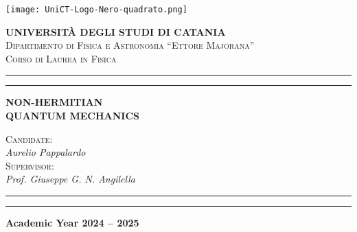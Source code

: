 \newcommand{\unictsize}{0.3\textwidth}
\newcommand{\dfasize}{0.6\textwidth}
\newcommand{\namesize}{0.8\textwidth}
\newcommand{\doublerule}{\hrule \vspace{3pt} \hrule}

\begin{titlingpage}
    \begin{center}
        \begin{minipage}[h!]{\linewidth}
            \begin{minipage}[ht!]{\linewidth}
                \centering
                \texttt{[image: UniCT-Logo-Nero-quadrato.png]}
            \end{minipage}
            \centering\large
            \textbf{UNIVERSITÀ DEGLI STUDI DI CATANIA}
            \\[5pt]
            \normalsize
            \textsc{Dipartimento di Fisica e Astronomia ``Ettore Majorana''}
            \\[5pt]
            \textsc{Corso di Laurea in Fisica}
            \\[10pt]
            \doublerule
        \end{minipage}
        \vfill
        {\Huge\bfseries NON-HERMITIAN\\[10pt]QUANTUM MECHANICS}
        \vfill
        \centering
        \large
        \begin{minipage}[h]{\namesize}
            \raggedleft
            \textsc{Candidate:}\\
            \textit{Aurelio Pappalardo}
            \\[10pt]
            \textsc{Supervisor:}\\
            \textit{Prof. Giuseppe G. N. Angilella}
        \end{minipage}
        \vspace{30pt}
        \doublerule
        \vspace{10pt}
        \normalsize
        \textbf{Academic Year 2024 -- 2025}
    \end{center}
\end{titlingpage}
\restoregeometry